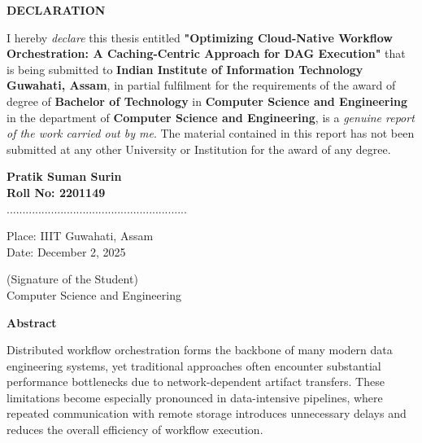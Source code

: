\documentclass[12pt,a4paper]{report}
\begin{document}
\newpage
\thispagestyle{empty}
\begin{center}
    \textbf{\Large DECLARATION}
\end{center}
\vspace{1cm}
I hereby \textit{declare} this thesis entitled \textbf{"Optimizing Cloud-Native Workflow Orchestration: A Caching-Centric Approach for DAG Execution"} that is being submitted to \textbf{Indian Institute of Information Technology Guwahati, Assam}, in partial fulfilment for the requirements of the award of degree of \textbf{Bachelor of Technology} in \textbf{Computer Science and Engineering} in the department of \textbf{Computer Science and Engineering}, is a \textit{genuine report of the work carried out by me}. The material contained in this report has not been submitted at any other University or Institution for the award of any degree.

\vspace{3cm}

\begin{flushright}
    \textbf{Pratik Suman Surin} \\
    \textbf{Roll No: 2201149} \\
    \vspace{1cm}
    ......................................................... \\
\end{flushright}

\begin{flushleft}
    Place: IIIT Guwahati, Assam \\
    Date: December 2, 2025 \\
\end{flushleft}
\vspace{-1.5cm}
\begin{flushright}
    (Signature of the Student) \\
    Computer Science and Engineering
\end{flushright}


\newpage
{}
\begin{center}
    \textbf{\Large Abstract}
\end{center}
\vspace{1cm}
Distributed workflow orchestration forms the backbone of many modern data engineering systems, yet traditional approaches often encounter substantial performance bottlenecks due to network-dependent artifact transfers. These limitations become especially pronounced in data-intensive pipelines, where repeated communication with remote storage introduces unnecessary delays and reduces the overall efficiency of workflow execution.
\end{document}
